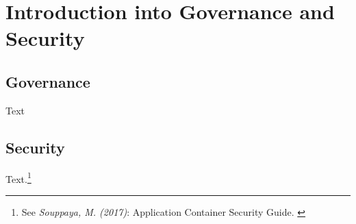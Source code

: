 %
%

\pagebreak
\section{Introduction into Governance and Security}

\onehalfspacing

\subsection{Governance}

Text

\subsection{Security}

Text.\footnote{See \textit{Souppaya, M. (2017)}: Application Container Security Guide. \cite{sp800-190}}

